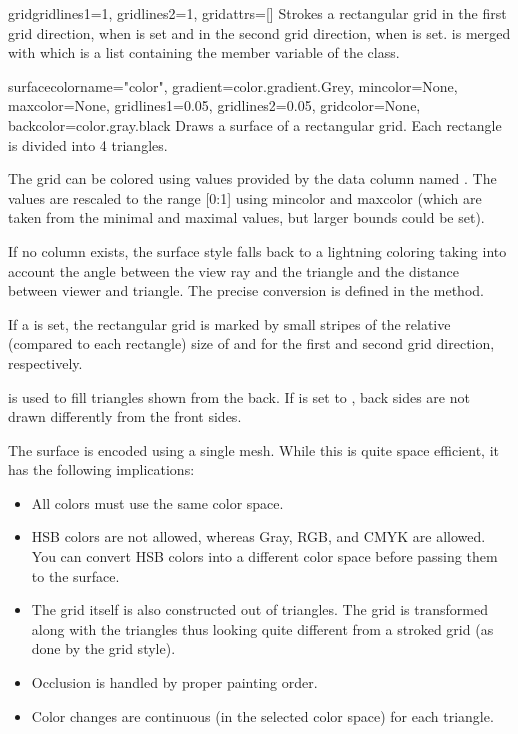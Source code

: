 \begin{classdesc}{grid}{gridlines1=1, gridlines2=1, gridattrs=[]} %
  Strokes a rectangular grid in the first grid direction, when
   is set and in the second grid direction, when
   is set.  is merged with
   which is a list containing the member
  variable  of the  class.
\end{classdesc} %

\begin{classdesc}{surface}{colorname="color", %
                           gradient=color.gradient.Grey,
                           mincolor=None, maxcolor=None,
                           gridlines1=0.05, gridlines2=0.05,
                           gridcolor=None,
                           backcolor=color.gray.black}
  Draws a surface of a rectangular grid. Each rectangle is divided
  into 4 triangles.

  The grid can be colored using values provided by the data column
  named . The values are rescaled to the range [0:1]
  using mincolor and maxcolor (which are taken from the minimal and
  maximal values, but larger bounds could be set).

  If no  column exists, the surface style falls back
  to a lightning coloring taking into account the angle between the
  view ray and the triangle and the distance between viewer and
  triangle. The precise conversion is defined in the
   method.

  If a  is set, the rectangular grid is marked by small
  stripes of the relative (compared to each rectangle) size of
   and  for the first and second grid
  direction, respectively.

   is used to fill triangles shown from the back. If
   is set to , back sides are not drawn
  differently from the front sides.

  The surface is encoded using a single mesh. While this is quite
  space efficient, it has the following implications:
  \begin{itemize}
    \item All colors must use the same color space.
    \item HSB colors are not allowed, whereas Gray, RGB, and CMYK are
    allowed. You can convert HSB colors into a different color space
    before passing them to the surface.
    \item The grid itself is also constructed out of triangles. The
    grid is transformed along with the triangles thus looking quite
    different from a stroked grid (as done by the grid style).
    \item Occlusion is handled by proper painting order.
    \item Color changes are continuous (in the selected color
    space) for each triangle.
  \end{itemize}
\end{classdesc} %

